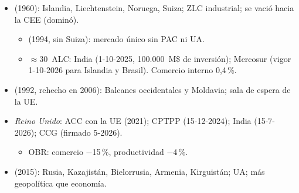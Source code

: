 \documentclass{article}
\begin{document}
\begin{columnas}
\begin{itemize}
\item {} (1960): Islandia, Liechtenstein, Noruega, Suiza; ZLC industrial; se vació hacia la CEE (dominó).
  \begin{itemize}
  \item {} (1994, sin Suiza): mercado único sin PAC ni UA.
  \item $\approx$30~ALC: India (1-10-2025, 100.000~M\$ de inversión); Mercosur (vigor 1-10-2026 para Islandia y Brasil). Comercio interno 0,4\,\%.
  \end{itemize}
\end{itemize}
\begin{itemize}
\item {} (1992, rehecho en 2006): Balcanes occidentales y Moldavia; sala de espera de la UE.
\item \emph{Reino Unido}: ACC con la UE (2021); CPTPP (15-12-2024); India (15-7-2026); CCG (firmado 5-2026).
  \begin{itemize}
  \item OBR: comercio $-$15\,\%, productividad $-$4\,\%.
  \end{itemize}
\item {} (2015): Rusia, Kazajistán, Bielorrusia, Armenia, Kirguistán; UA; más geopolítica que economía.
\end{itemize}


\end{columnas}
\end{document}
